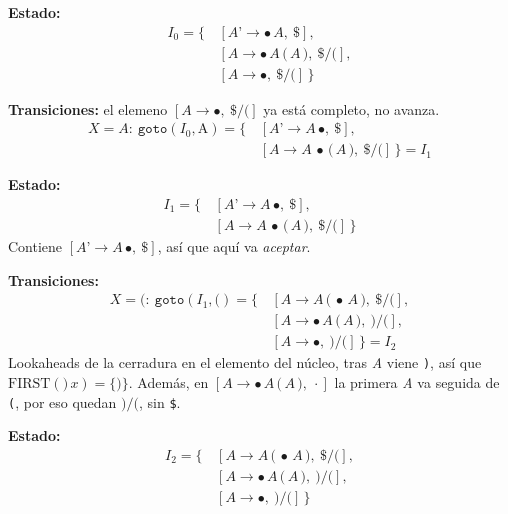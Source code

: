 \documentclass[12pt,letterpaper]{article}
\newcommand{\nt}[1]{\textit{#1}}
\newcommand{\tk}[1]{\texttt{#1}}
\newcommand{\tx}[1]{\text{#1}}
\newcommand{\First}[1]{\mathrm{FIRST}(#1)}
\begin{document}
\begin{enumerate}[label=\arabic*.]
  \medskip

  \textbf{Estado:}
  \[
  \begin{aligned}
    I_0 = \{\, & [\nt{A'}\to\bullet\,\nt{A},\ \tk{\$}],\\
               & [\nt{A}\to\bullet\,\nt{A}\,\tk{(}\,\nt{A}\,\tk{)},\ \tk{\$}/\tk{(}],\\
               & [\nt{A}\to\bullet,\ \tk{\$}/\tk{(}]\,\}
  \end{aligned}
  \]

  \textbf{Transiciones:} el elemeno $[\nt{A}\to\bullet,\ \tk{\$}/\tk{(}]$ ya está completo, no avanza.
  \[
  \begin{aligned}
    X=\nt{A}:\ \texttt{goto}(I_0,\tx{A}) = \{\, & [\nt{A'}\to\nt{A}\,\bullet,\ \tk{\$}],\\
    & [\nt{A}\to\nt{A}\,\bullet\,\tk{(}\,\nt{A}\,\tk{)},\ \tk{\$}/\tk{(}]\,\} = \boxed{I_1}
  \end{aligned}
  \]

  \medskip

  \textbf{Estado:}
  \[
  \begin{aligned}
    I_1 = \{\, & [\nt{A'}\to\nt{A}\,\bullet,\ \tk{\$}],\\
               & [\nt{A}\to\nt{A}\,\bullet\,\tk{(}\,\nt{A}\,\tk{)},\ \tk{\$}/\tk{(}]\,\}
  \end{aligned}
  \]
  Contiene $[\nt{A'}\to\nt{A}\,\bullet,\ \tk{\$}]$, así que aquí va \textit{aceptar}.

  \textbf{Transiciones:}
  \[
  \begin{aligned}
    X=\tk{(}:\ \texttt{goto}(I_1,\tk{(}) = \{\, & [\nt{A}\to\nt{A}\,\tk{(}\,\bullet\,\nt{A}\,\tk{)},\ \tk{\$}/\tk{(}],\\
    & [\nt{A}\to\bullet\,\nt{A}\,\tk{(}\,\nt{A}\,\tk{)},\ \tk{)}/\tk{(}],\\
    & [\nt{A}\to\bullet,\ \tk{)}/\tk{(}]\,\} = \boxed{I_2}
  \end{aligned}
  \]
  Lookaheads de la cerradura en el elemento del núcleo, tras \nt{A} viene \tk{)}, así que
  $\First{\tk{)}\,x}=\{\tk{)}\}$. Además, en $[\nt{A}\to\bullet\,\nt{A}\,\tk{(}\,\nt{A}\,\tk{)},\ \cdot]$
  la primera \nt{A} va seguida de \tk{(}, por eso quedan $\tk{)}/\tk{(}$, sin \tk{\$}.

  \medskip

  \textbf{Estado:}
  \[
  \begin{aligned}
    I_2 = \{\, & [\nt{A}\to\nt{A}\,\tk{(}\,\bullet\,\nt{A}\,\tk{)},\ \tk{\$}/\tk{(}],\\
               & [\nt{A}\to\bullet\,\nt{A}\,\tk{(}\,\nt{A}\,\tk{)},\ \tk{)}/\tk{(}],\\
               & [\nt{A}\to\bullet,\ \tk{)}/\tk{(}]\,\}
  \end{aligned}
  \]


\end{enumerate}
\end{document}
